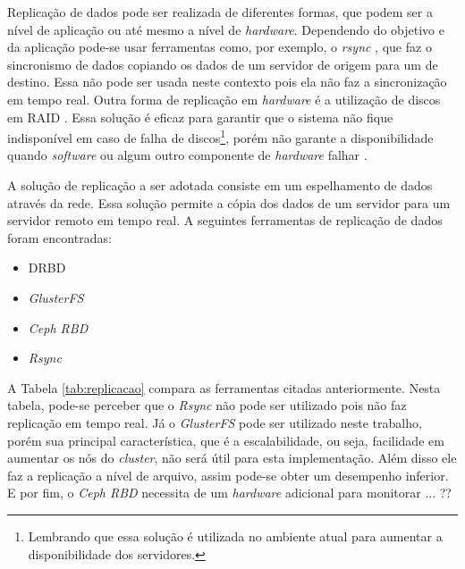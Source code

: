 Replicação de dados pode ser realizada de diferentes formas, que podem ser a nível de aplicação ou até mesmo a nível de \textit{hardware}.
Dependendo do objetivo e da aplicação pode-se usar ferramentas como, por exemplo, o \textit{rsync} \cite{rsync}, que faz o sincronismo de dados 
copiando os dados de um servidor de origem para um de destino. Essa não pode ser usada neste contexto pois ela não faz a sincronização em tempo
real. Outra forma de replicação em \textit{hardware} é a utilização de discos em \ac{RAID} \cite{raid}. Essa solução é eficaz para garantir que 
o sistema não fique indisponível em caso de falha de discos\footnote{Lembrando que essa solução é utilizada no ambiente atual para aumentar a 
disponibilidade dos servidores.}, porém não garante a disponibilidade quando \textit{software} ou algum outro componente de \textit{hardware} 
falhar \cite{zaminhani2008}.

A solução de replicação a ser adotada consiste em um espelhamento de dados através da rede. Essa solução permite a cópia dos dados de um servidor
para um servidor remoto em tempo real. A seguintes ferramentas de replicação de dados foram encontradas:
\begin{itemize}
 \item \ac{DRBD} \cite{drbd}
 \item \textit{GlusterFS} \cite{glusterfs}
 \item \textit{Ceph RBD} \cite{cephrbd}
 \item \textit{Rsync} \cite{rsync}
\end{itemize}

A Tabela \ref{tab:replicacao} compara as ferramentas citadas anteriormente. Nesta tabela, pode-se perceber que o \textit{Rsync} não pode ser
utilizado pois não faz replicação em tempo real. Já o \textit{GlusterFS} pode ser utilizado neste trabalho, porém sua principal característica, 
que é a escalabilidade, ou seja, facilidade em aumentar os nós do \textit{cluster}, não será útil para esta implementação.
Além disso ele faz a replicação a nível de arquivo, assim pode-se obter um desempenho inferior.
E por fim, o \textit{Ceph RBD} necessita de um \textit{hardware} adicional para monitorar ... ??

